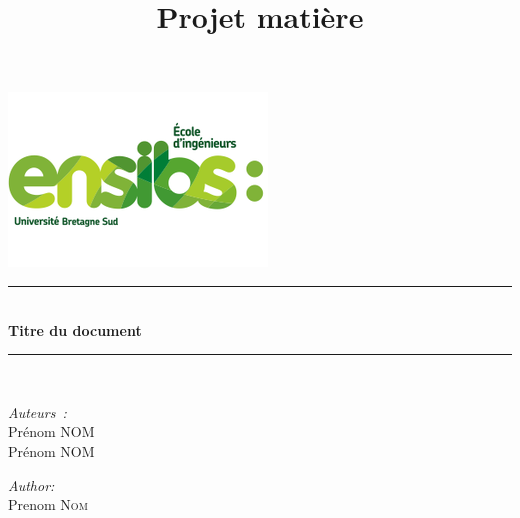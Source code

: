 \documentclass[12pt]{article}
\title{Projet matière}
\begin{document}
\begin{titlepage}

\newcommand{\HRule}{\rule{\linewidth}{0.5mm}}

\center %
 

\includegraphics[scale=3]{assets/ensibs.png}\\[1cm] %


\HRule \\[0.4cm]
{ \huge \bfseries Titre du document
}\\[0.4cm]
\HRule \\[1.5cm]
 



\begin{flushleft} \large
\emph{Auteurs :}\\
Prénom \textsc{NOM}\\
Prénom \textsc{NOM}\\
\end{flushleft}

\Large \emph{Author:}\\
Prenom \textsc{Nom}\\[3cm] %


\end{titlepage}
\end{document}
